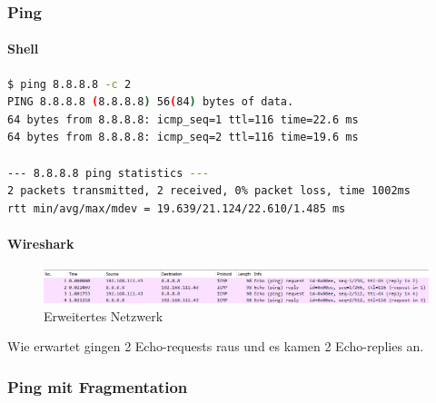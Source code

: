 \subsubsection{Ping}
\paragraph{Shell}
\begin{lstlisting}[language=Bash, caption=Ping Google Public DNS]
$ ping 8.8.8.8 -c 2
PING 8.8.8.8 (8.8.8.8) 56(84) bytes of data.
64 bytes from 8.8.8.8: icmp_seq=1 ttl=116 time=22.6 ms
64 bytes from 8.8.8.8: icmp_seq=2 ttl=116 time=19.6 ms

--- 8.8.8.8 ping statistics ---
2 packets transmitted, 2 received, 0% packet loss, time 1002ms
rtt min/avg/max/mdev = 19.639/21.124/22.610/1.485 ms
\end{lstlisting}
\paragraph{Wireshark}
\begin{figure}[!htb]
    \centering
    \includegraphics[width=\textwidth,height=.85\textwidth,keepaspectratio]{./img/echo_reply_request.png}
    \caption{Erweitertes Netzwerk}
\end{figure}
\FloatBarrier
Wie erwartet gingen 2 Echo-requests raus und es kamen 2 Echo-replies an.
\subsubsection{Ping mit Fragmentation}
